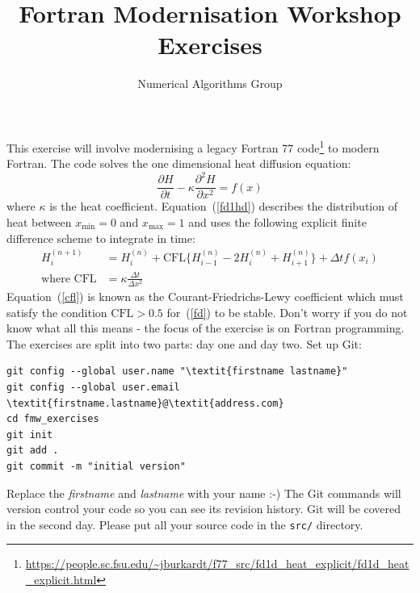 \documentclass[12pt]{article}
\begin{document}
 
 
 
\title{\bf Fortran Modernisation Workshop \\ Exercises}
\author{Numerical Algorithms Group}
 
\maketitle

This exercise will involve modernising a legacy Fortran 77 code\footnote{\url{https://people.sc.fsu.edu/~jburkardt/f77_src/fd1d_heat_explicit/fd1d_heat_explicit.html}} to modern Fortran. The code solves the one dimensional heat diffusion equation:
\begin{equation} \label{fd1hd}
\frac{\partial H}{\partial t} - \kappa\frac{\partial^{2} H}{\partial x^{2}} = f(x)
\end{equation}
where $\kappa$ is the heat coefficient. Equation~(\ref{fd1hd}) describes the distribution of heat 
between $x_{\text{min}}=0$ and $x_{\text{max}}=1$ and uses the following explicit finite difference 
scheme to integrate in time:
\begin{align}
H^{(n+1)}_{i} & = H^{(n)}_{i} + \text{CFL}\big\{H^{(n)}_{i-1}-2H^{(n)}_{i} +
                      H^{(n)}_{i+1}\big\} + \Delta t f(x_{i}) \label{fd} \\
            \text{where CFL} & = \kappa\frac{\Delta t}{\Delta x^{2}} \label{cfl}
\end{align}
Equation~(\ref{cfl}) is known as the Courant-Friedrichs-Lewy coefficient which must satisfy
the condition $\text{CFL} > 0.5$ for~(\ref{fd}) to be stable. Don't worry if you do 
not know what all this means - the focus of the exercise is on Fortran programming. \\

The exercises are split into two parts: day one and day two. Set up Git:
\begin{Verbatim}[commandchars=\\\{\}]
git config --global user.name "\textit{firstname lastname}"
git config --global user.email \textit{firstname.lastname}@\textit{address.com}
cd fmw_exercises
git init
git add .
git commit -m "initial version"
\end{Verbatim}
Replace the \textit{firstname} and \textit{lastname} with your name :-) The Git commands
will version control your code so you can see its revision history. Git will
be covered in the second day. Please put all your source code in the \texttt{src/}
directory. \\
\end{document}
